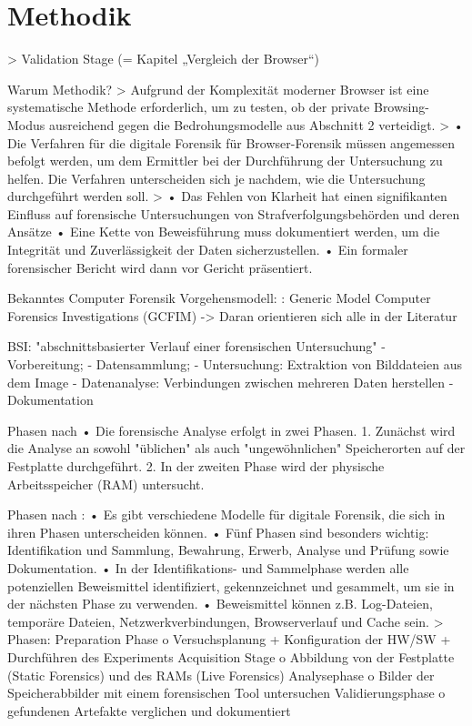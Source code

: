 \chapter{Methodik}

> Validation Stage (= Kapitel „Vergleich der Browser“)

Warum Methodik? 
	> \cite{Aggarwal.2010}
		Aufgrund der Komplexität moderner Browser ist eine systematische Methode erforderlich, um zu testen, ob der private Browsing-Modus ausreichend gegen die Bedrohungsmodelle aus Abschnitt 2 verteidigt.		
	> \cite{Izzati.2022}
		•	Die Verfahren für die digitale Forensik für Browser-Forensik müssen angemessen befolgt werden, um dem Ermittler bei der Durchführung der Untersuchung zu helfen. Die Verfahren unterscheiden sich je nachdem, wie die Untersuchung durchgeführt werden soll.
	> \cite{Horsman.2019}
		•	Das Fehlen von Klarheit hat einen signifikanten Einfluss auf forensische Untersuchungen von Strafverfolgungsbehörden und deren Ansätze
		•	Eine Kette von Beweisführung muss dokumentiert werden, um die Integrität und Zuverlässigkeit der Daten sicherzustellen.
		•	Ein formaler forensischer Bericht wird dann vor Gericht präsentiert.
	
	
Bekanntes Computer Forensik Vorgehensmodell: \cite{Yusoff.2011}: Generic Model Computer Forensics Investigations (GCFIM) -> Daran orientieren sich alle in der Literatur

BSI: "abschnittsbasierter Verlauf einer forensischen Untersuchung" %
- Vorbereitung;
- Datensammlung;
- Untersuchung: Extraktion von Bilddateien aus dem Image
- Datenanalyse: Verbindungen zwischen mehreren Daten herstellen
- Dokumentation

Phasen nach \cite{Montasari.2015}
	•	Die forensische Analyse erfolgt in zwei Phasen.
	1.	Zunächst wird die Analyse an sowohl "üblichen" als auch "ungewöhnlichen" Speicherorten auf der Festplatte durchgeführt.
	2.	In der zweiten Phase wird der physische Arbeitsspeicher (RAM) untersucht.

Phasen nach \cite{Izzati.2022}:
	•	Es gibt verschiedene Modelle für digitale Forensik, die sich in ihren Phasen unterscheiden können.
	•	Fünf Phasen sind besonders wichtig: Identifikation und Sammlung, Bewahrung, Erwerb, Analyse und Prüfung sowie Dokumentation.
	•	In der Identifikations- und Sammelphase werden alle potenziellen Beweismittel identifiziert, gekennzeichnet und gesammelt, um sie in der nächsten Phase zu verwenden.
	•	Beweismittel können z.B. Log-Dateien, temporäre Dateien, Netzwerkverbindungen, Browserverlauf und Cache sein.
	> Phasen:
		Preparation Phase
		o	Versuchsplanung + Konfiguration der HW/SW + Durchführen des Experiments Acquisition Stage
		o	Abbildung von der Festplatte (Static Forensics) und des RAMs (Live Forensics) Analysephase
		o	Bilder der Speicherabbilder mit einem forensischen Tool untersuchen	Validierungsphase
		o	gefundenen Artefakte verglichen und dokumentiert

